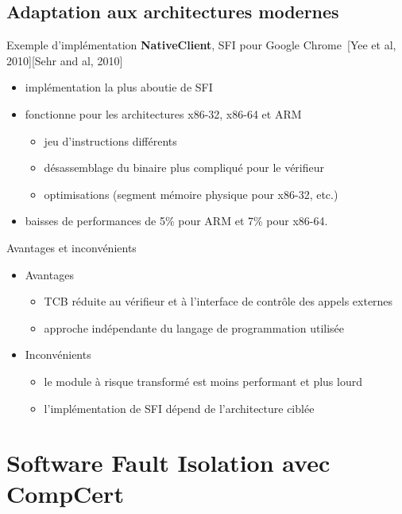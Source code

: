 \documentclass[10pt,usenames,dvipsnames]{beamer}
\begin{document}
\subsection{Adaptation aux architectures modernes}
\begin{frame}{Exemple d'implémentation}
	\textbf{NativeClient}, SFI pour Google Chrome~[Yee et al, 2010][Sehr and al, 2010]
	\begin{itemize}
		\item implémentation la plus aboutie de SFI
		\item fonctionne pour les architectures x86-32, x86-64 et ARM
			\begin{itemize}
				\item jeu d'instructions différents
				\item désassemblage du binaire plus compliqué pour le vérifieur
				\item optimisations (segment mémoire physique pour x86-32, etc.)
			\end{itemize}
		\item baisses de performances de 5\% pour ARM et 7\% pour x86-64.
	\end{itemize}
\end{frame}

\begin{frame}{Avantages et inconvénients}
	\begin{itemize}
		\item Avantages
		\begin{itemize}
			\item TCB réduite au vérifieur et à l'interface de contrôle des appels externes
			\item approche indépendante du langage de programmation utilisée
		\end{itemize}
		\item Inconvénients
		\begin{itemize}
			\item le module à risque transformé est moins performant et plus lourd
			\item l'implémentation de SFI dépend de l'architecture ciblée
		\end{itemize}
	\end{itemize}
	
\end{frame}

\section{Software Fault Isolation avec CompCert}
\end{document}
